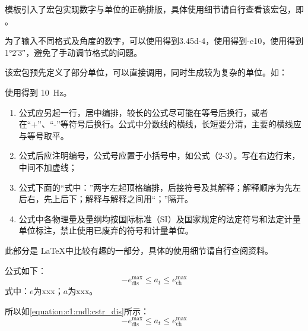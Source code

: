\clearpage



模板引入了宏包实现数字与单位的正确排版，具体使用细节请自行查看该宏包，即 。

为了输入不同格式及角度的数字，可以使用得到\num{3.45d-4}，使用得到\num{-e10}，使用得到\ang{1;2;3}，避免了手动调节格式的问题。

该宏包预先定义了部分单位，可以直接调用，同时生成较为复杂的单位。如：

使用得到 \SI{10}{\hertz}。



\begin{tcolorbox}[colback=red!5!white,colframe=red!75!black]
  \begin{enumerate}[leftmargin=0.5cm]
    \item 公式应另起一行，居中编排，较长的公式尽可能在等号后换行，或者在“+”、“-”等符号后换行。公式中分数线的横线，长短要分清，主要的横线应与等号取平。
    \item 公式后应注明编号，公式号应置于小括号中，如公式（2-3）。写在右边行末，中间不加虚线；
    \item 公式下面的“式中：”两字左起顶格编排，后接符号及其解释；解释顺序为先左后右，先上后下；解释与解释之间用“；”隔开。
    \item 公式中各物理量及量纲均按国际标准（SI）及国家规定的法定符号和法定计量单位标注，禁止使用已废弃的符号和计量单位。
  \end{enumerate}
\end{tcolorbox}

此部分是 \LaTeX 中比较有趣的一部分，具体的使用细节请自行查阅资料。

\begin{texcode}[]{}
  公式如下：
  \begin{equation}
      -e^{\max}_\text{dis} \leq a_t \leq e^{\max}_\text{ch}\label{equation:c1:mdl:cstr_dis}
  \end{equation}
  式中：$e$为xxx；$a$为xxx。
\end{texcode}

所以如\cref{equation:c1:mdl:cstr_dis}所示：
\begin{equation}\label{equation:c1:exp}
    -e^{\max}_\text{dis} \leq a_t \leq e^{\max}_\text{ch}
\end{equation}

